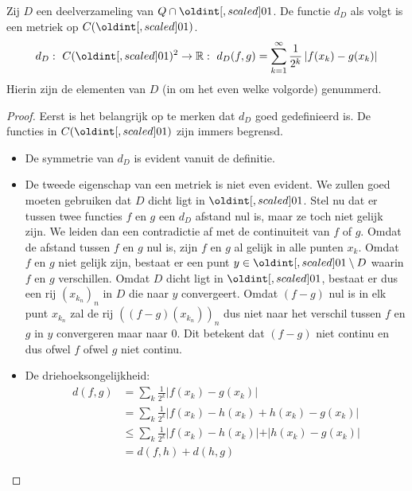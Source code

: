 \documentclass[main.tex]{subfiles}
\begin{document}
\begin{vb}
  Zij $D$ een deelverzameling van $Q \cap \interval{0}{1}$.
  De functie $d_{D}$ als volgt is een metriek op $C(\interval{0}{1})$.
  \[ d_{D}:\ C(\interval{0}{1})^{2} \rightarrow \mathbb{R}:\ d_{D}(f,g) = \sum_{k=1}^{\infty}\frac{1}{2^{k}}\left| f(x_{k}) - g(x_{k})\right| \]
  Hierin zijn de elementen van $D$ (in om het even welke volgorde) genummerd.
  
  \begin{proof}
    Eerst is het belangrijk op te merken dat $d_{D}$ goed gedefinieerd is.
    De functies in $C(\interval{0}{1})$ zijn immers begrensd.
    \begin{itemize}
    \item De symmetrie van $d_{D}$ is evident vanuit de definitie.
    \item De tweede eigenschap van een metriek is niet even evident.
      We zullen goed moeten gebruiken dat $D$ dicht ligt in $\interval{0}{1}$.
      Stel nu dat er tussen twee functies $f$ en $g$ een $d_{D}$ afstand nul is, maar ze toch niet gelijk zijn.
      We leiden dan een contradictie af met de continuiteit van $f$ of $g$.
      Omdat de afstand tussen $f$ en $g$ nul is, zijn $f$ en $g$ al gelijk in alle punten $x_{k}$.
      Omdat $f$ en $g$ niet gelijk zijn, bestaat er een punt $y\in \interval{0}{1} \setminus D$ waarin $f$ en $g$ verschillen.
      Omdat $D$ dicht ligt in $\interval{0}{1}$, bestaat er dus een rij $(x_{k_{n}})_{n}$ in $D$ die naar $y$ convergeert.
      Omdat $(f-g)$ nul is in elk punt $x_{k_{n}}$ zal de rij $((f-g)(x_{k_{n}}))_{n}$ dus niet naar het verschil tussen $f$ en $g$ in $y$ convergeren maar naar $0$.
      Dit betekent dat $(f-g)$ niet continu en dus ofwel $f$ ofwel $g$ niet continu.
    \item De driehoeksongelijkheid:
      \begin{align*}
        d(f,g)
        &= \sum_{k}\frac{1}{2^{k}}\left| f(x_{k}) - g(x_{k})\right|\\
        &= \sum_{k}\frac{1}{2^{k}}\left| f(x_{k}) - h(x_{k}) + h(x_{k}) - g(x_{k})\right|\\
        &\le \sum_{k}\frac{1}{2^{k}}\left| f(x_{k}) - h(x_{k})| + |h(x_{k}) - g(x_{k})\right|\\
        &= d(f,h) + d(h,g)
      \end{align*}
    \end{itemize}
  \end{proof}
\end{vb}
\end{document}
